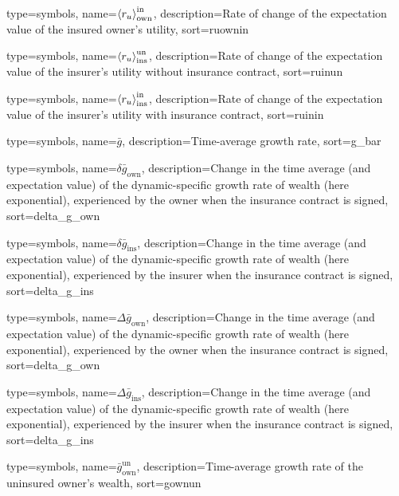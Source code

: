 {
  type={symbols}, 
  name={\ensuremath{\ave{r_u}_{\text{own}}^{\text{in}}}},
  description={Rate of change of the expectation value of the insured owner's utility},
  sort=ruownin
}


{
  type={symbols}, 
  name={\ensuremath{\ave{r_u}_{\text{ins}}^{\text{un}}}},
  description={Rate of change of the expectation value of the insurer's utility without insurance contract},
  sort=ruinun
}

{
  type={symbols}, 
  name={\ensuremath{\ave{r_u}_{\text{ins}}^{\text{in}}}},
  description={Rate of change of the expectation value of the insurer's utility with insurance contract},
  sort=ruinin
}



{
  type={symbols}, 
  name={\ensuremath{\bar{g}}},
  description={Time-average growth rate},
  sort=g_bar
}


{
 type={symbols}, 
 name={\ensuremath{\delta \bar{g}_{\text{own}}}},
 description={Change in the time average (and expectation value) of the dynamic-specific growth rate of wealth (here exponential), experienced by the owner when the insurance contract is signed},
 sort=delta_g_own
}

{
 type={symbols}, 
 name={\ensuremath{\delta \bar{g}_{\text{ins}}}},
 description={Change in the time average (and expectation value) of the dynamic-specific growth rate of wealth (here exponential), experienced by the insurer when the insurance contract is signed},
 sort=delta_g_ins
}

{
 type={symbols}, 
 name={\ensuremath{\Delta \bar{g}_{\text{own}}}},
 description={Change in the time average (and expectation value) of the dynamic-specific growth rate of wealth (here exponential), experienced by the owner when the insurance contract is signed},
 sort=delta_g_own
}

{
 type={symbols}, 
 name={\ensuremath{\Delta \bar{g}_{\text{ins}}}},
 description={Change in the time average (and expectation value) of the dynamic-specific growth rate of wealth (here exponential), experienced by the insurer when the insurance contract is signed},
 sort=delta_g_ins
}

{
  type={symbols}, 
  name={\ensuremath{\bar{g}_{\text{own}}^{\text{un}}}},
  description={Time-average growth rate of the uninsured owner's wealth},
  sort=gownun
}

